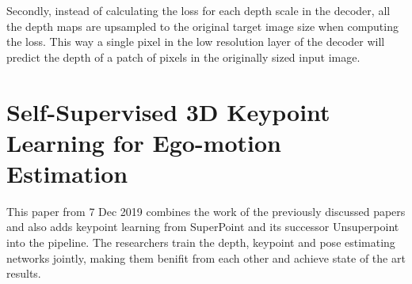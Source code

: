 Secondly, instead of calculating the loss for each depth scale in the decoder, all the depth maps are upsampled to the original target image size when computing the loss. This way a single pixel in the low resolution layer of the decoder will predict the depth of a patch of pixels in the originally sized input image.

\section{Self-Supervised 3D Keypoint Learning for Ego-motion Estimation \cite{keypointdepth}}

This paper from 7 Dec 2019 combines the work of the previously discussed papers and also adds keypoint learning from SuperPoint\cite{superpoint} and its successor Unsuperpoint\cite{unsuperpoint} into the pipeline.
The researchers train the depth, keypoint and pose estimating networks jointly, making them benifit from each other and achieve state of the art results.